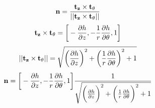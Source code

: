 \documentclass{article}
\begin{document}
\begin{equation}
{\bf n} = \frac{ {\bf t_{z}} \times {\bf t_{\theta }}}{||{\bf t_{z}} \times {\bf t_{\theta }}||}
\end{equation}
\begin{equation}
{\bf t_{z}} \times {\bf t_{\theta }} = \bigg[-\frac{\partial h}{\partial z} , -\frac{1}{r}\frac{\partial h}{\partial \theta} ,1\bigg]
\end{equation}
\begin{equation}
||{\bf t_{z}} \times {\bf t_{\theta }}|| = \sqrt{\bigg(\frac{\partial h}{\partial z}\bigg)^2 + \bigg(\frac{1}{r}\frac{\partial h}{\partial \theta}\bigg)^2 + 1}
\end{equation}
\begin{equation}
{\bf n} = \bigg[-\frac{\partial h}{\partial z} , -\frac{1}{r}\frac{\partial h}{\partial \theta} ,1\bigg]\frac{1}{\sqrt{\bigg(\frac{\partial h}{\partial z}\bigg)^2 + \bigg(\frac{1}{r}\frac{\partial h}{\partial \theta}\bigg)^2 + 1}}
\end{equation}
\end{document}
